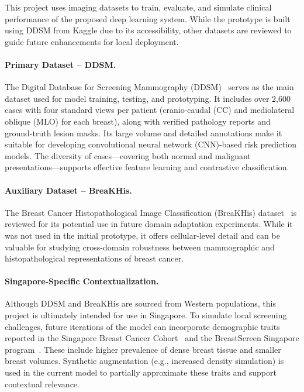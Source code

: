 \documentclass[12pt]{article}
\begin{document}
This project uses imaging datasets to train, evaluate, and simulate clinical performance of the proposed deep learning system. While the prototype is built using DDSM from Kaggle due to its accessibility, other datasets are reviewed to guide future enhancements for local deployment.

\paragraph{Primary Dataset – DDSM.}
The Digital Database for Screening Mammography (DDSM)~\cite{17} serves as the main dataset used for model training, testing, and prototyping. It includes over 2,600 cases with four standard views per patient (cranio-caudal (CC) and mediolateral oblique (MLO) for each breast), along with verified pathology reports and ground-truth lesion masks. Its large volume and detailed annotations make it suitable for developing convolutional neural network (CNN)-based risk prediction models. The diversity of cases—covering both normal and malignant presentations—supports effective feature learning and contrastive classification.

\paragraph{Auxiliary Dataset – BreaKHis.}
The Breast Cancer Histopathological Image Classification (BreaKHis) dataset~\cite{18} is reviewed for its potential use in future domain adaptation experiments. While it was not used in the initial prototype, it offers cellular-level detail and can be valuable for studying cross-domain robustness between mammographic and histopathological representations of breast cancer.

\paragraph{Singapore-Specific Contextualization.}
Although DDSM and BreaKHis are sourced from Western populations, this project is ultimately intended for use in Singapore. To simulate local screening challenges, future iterations of the model can incorporate demographic traits reported in the Singapore Breast Cancer Cohort~\cite{6} and the BreastScreen Singapore program~\cite{19}. These include higher prevalence of dense breast tissue and smaller breast volumes. Synthetic augmentation (e.g., increased density simulation) is used in the current model to partially approximate these traits and support contextual relevance.
\end{document}
